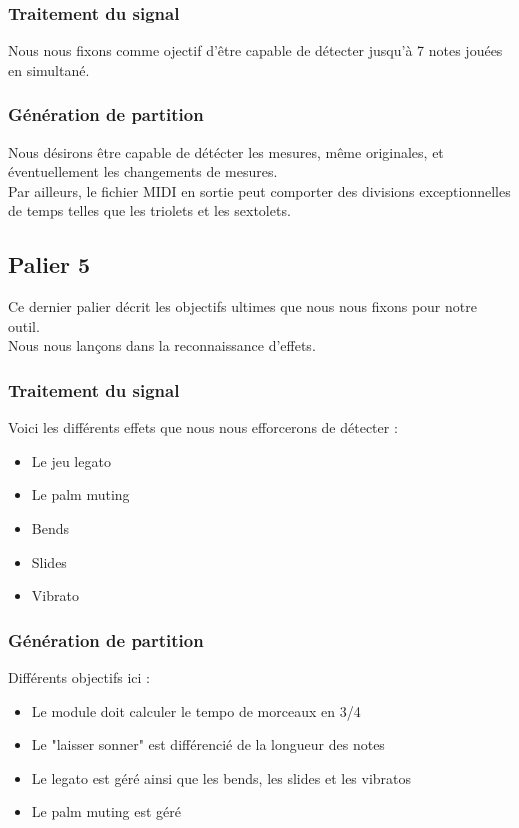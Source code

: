 \documentclass[12pt]{article}
\begin{document}
\subsubsection{Traitement du signal}

Nous nous fixons comme ojectif d'être capable de détecter jusqu'à 7 notes jouées en simultané.

\subsubsection{Génération de partition}

Nous désirons être capable de détécter les mesures, même originales, et éventuellement les changements de mesures.\\

Par ailleurs, le fichier MIDI en sortie peut comporter des divisions exceptionnelles de temps telles que les triolets et les sextolets.

\newpage
\subsection{Palier 5}

Ce dernier palier décrit les objectifs ultimes que nous nous fixons pour notre outil. \\

Nous nous lançons dans la reconnaissance d'effets.

\subsubsection{Traitement du signal}

Voici les différents effets que nous nous efforcerons de détecter :
\begin{itemize}
\item Le jeu legato
\item Le palm muting
\item Bends
\item Slides
\item Vibrato
\end{itemize}

\subsubsection{Génération de partition}

Différents objectifs ici :

\begin{itemize}
\item Le module doit calculer le tempo de morceaux en 3/4
\item Le "laisser sonner" est différencié de la longueur des notes
\item Le legato est géré ainsi que les bends, les slides et les vibratos
\item Le palm muting est géré
\end{itemize}
\end{document}
